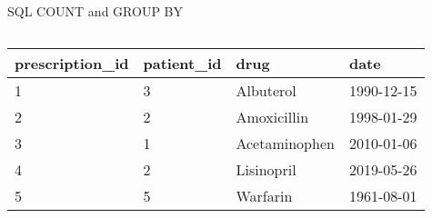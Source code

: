 \documentclass[aspectratio=169]{beamer}
\begin{document}
	\begin{frame}[fragile]{SQL COUNT and GROUP BY}
		\begin{columns}
			\begin{tcolorbox}
				\tiny
				\begin{tabular}{llll}
					\bf prescription\_id & \bf patient\_id & \bf drug & \bf date \\ \hline
					1 & 3 & Albuterol & 1990-12-15 \\
					2 & 2 & Amoxicillin & 1998-01-29 \\
					3 & 1 & Acetaminophen & 2010-01-06 \\
					4 & 2 & Lisinopril & 2019-05-26 \\
					5 & 5 & Warfarin & 1961-08-01 \\
				\end{tabular}
			\end{tcolorbox}
		\end{columns}
		\begin{columns}
			\column{0.47\linewidth}
		\end{columns}
	\end{frame}
\end{document}
